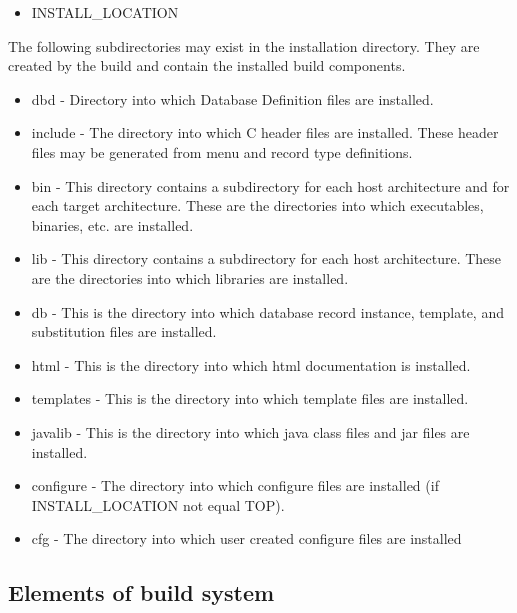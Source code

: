 \begin{itemize}\item {}INSTALL\_LOCATION

\end{itemize}The following subdirectories may exist in the installation directory. They are created by the build and contain the installed 
build components.

\begin{itemize}\item {}dbd - Directory into which Database Definition files are installed.

\item {}include - The directory into which C header files are installed. These header files may be generated from menu and 
record type definitions.

\item {}bin - This directory contains a subdirectory for each host architecture and for each target architecture. These are the 
directories into which executables, binaries, etc. are installed.

\item {}lib - This directory contains a subdirectory for each host architecture. These are the directories into which libraries 
are installed.

\item {}db - This is the directory into which database record instance, template, and substitution files are installed.

\item {}html - This is the directory into which html documentation is installed.

\item {}templates - This is the directory into which template files are installed.

\item {}javalib - This is the directory into which java class files and jar files are installed.

\item {}configure - The directory into which configure files are installed (if INSTALL\_LOCATION not equal TOP).

\item {}cfg - The directory into which user created configure files are installed 

\end{itemize}\subsection{Elements of build system}

